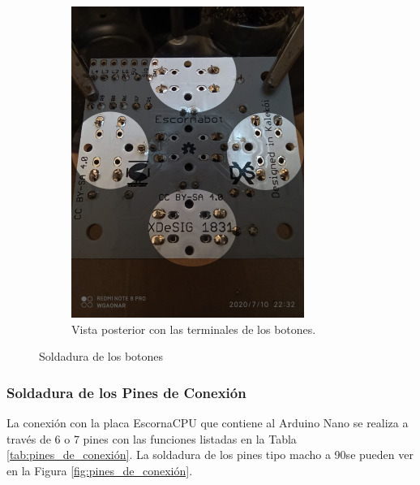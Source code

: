 \documentclass{article}
\begin{document}
\begin{figure}[H]
\begin{subfigure}[t]{0.3\textwidth}
        \includegraphics[width=0.9\columnwidth, height=1.2\columnwidth]{images/Botonera/botones2.jpg}
        \caption{Vista posterior con las terminales de los botones.}
        \label{fig:botones_posterior}
    \end{subfigure}
    \caption{Soldadura de los botones}
    \label{fig:botones_soldadura}
\end{figure}

\subsubsection{Soldadura de los Pines de Conexión}
La conexión con la placa EscornaCPU que contiene al Arduino Nano se realiza a través de 6 o 7 pines con las funciones listadas en la Tabla \ref{tab:pines_de_conexión}. La soldadura de los pines tipo macho a 90\degree se pueden ver en la Figura \ref{fig:pines_de_conexión}.
\end{document}
